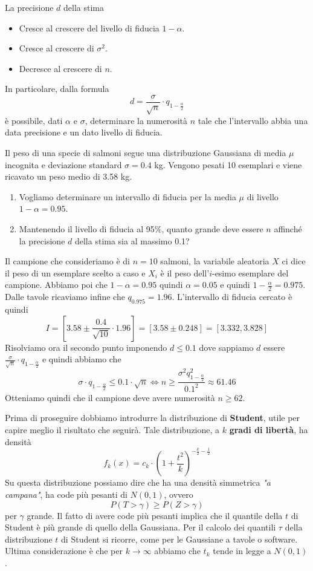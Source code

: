 \begin{observation}
	La precisione $d$ della stima
	\begin{itemize}
		\item Cresce al crescere del livello di fiducia $1-\alpha$.
		\item Cresce al crescere di $\sigma^2$.
		\item Decresce al crescere di $n$.
	\end{itemize}
	In particolare, dalla formula
	\[ d = \frac{\sigma}{\sqrt{n}} \cdot q_{1 - \frac{\alpha}{2}} \]
	è possibile, dati $\alpha$ e $\sigma$, determinare la numerosità $n$ tale che l'intervallo
	abbia una data precisione e un dato livello di fiducia.
\end{observation}

\begin{example}
	Il peso di una specie di salmoni segue una distribuzione Gaussiana di media $\mu$ incognita e
	deviazione standard $\sigma = 0.4$ kg. Vengono pesati 10 esemplari e viene ricavato un peso medio
	di 3.58 kg.
	\begin{enumerate}
		\item Vogliamo determinare un intervallo di fiducia per la media $\mu$ di livello
		      $1 - \alpha = 0.95$.
		\item Mantenendo il livello di fiducia al 95\%, quanto grande deve essere $n$ affinché la
		      precisione $d$ della stima sia al massimo 0.1?
	\end{enumerate}
	Il campione che consideriamo è di $n=10$ salmoni, la variabile aleatoria $X$ ci dice
	il peso di un esemplare scelto a caso e $X_i$ è il peso dell'$i$-esimo esemplare del campione.
	Abbiamo poi che $1-\alpha = 0.95$ quindi $\alpha=0.05$ e quindi $1 - \frac{\alpha}{2} = 0.975$.
	Dalle tavole ricaviamo infine che $q_{0.975} = 1.96$. L'intervallo di fiducia cercato è quindi
	\[
		I = \left[ 3.58 \pm \frac{0.4}{\sqrt{10}} \cdot 1.96 \right]
		= [ 3.58 \pm 0.248 ] = [ 3.332, 3.828 ]
	\]
	Risolviamo ora il secondo punto imponendo $d \leq 0.1$ dove sappiamo $d$ essere
	$\frac{\sigma}{\sqrt{n}} \cdot q_{1-\frac{\alpha}{2}}$ e quindi abbiamo che
	\[
		\sigma \cdot q_{1-\frac{\alpha}{2}} \leq 0.1 \cdot \sqrt{n} \iff
		n \geq \frac{\sigma^2 q_{1-\frac{\alpha}{2}}^2}{0.1^2} \approx 61.46
	\]
	Otteniamo quindi che il campione deve avere numerosità $n \geq 62$.
\end{example}

Prima di proseguire dobbiamo introdurre la distribuzione di \textbf{Student}, utile per capire
meglio il risultato che seguirà. Tale distribuzione, a $k$ \textbf{gradi di libertà}, ha densità
\[
	f_{k} (x) = c_k \cdot
	\left( 1 + \frac{t^2}{k} \right)^{-\frac{k}{2} - \frac{1}{2}}
\]
Su questa distribuzione possiamo dire che ha una densità simmetrica \emph{"a campana"}, ha code
più pesanti di $N(0,1)$, ovvero
\[ P(T > \gamma) \geq P(Z > \gamma) \]
per $\gamma$ grande. Il fatto di avere code più pesanti implica che il quantile della $t$ di
Student è più grande di quello della Gaussiana. Per il calcolo dei quantili $\tau$ della
distribuzione $t$ di Student si ricorre, come per le Gaussiane a tavole o software. Ultima
considerazione è che per $k \to \infty$ abbiamo che $t_k$ tende in legge a $N(0,1)$.

